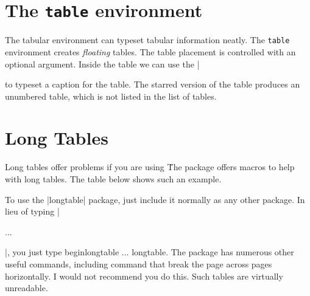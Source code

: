 \clearpage
\begin{multicols}{2}
\section{The \texttt{table} environment}

The tabular environment can typeset tabular information neatly. The \texttt{table} environment creates \textit{floating} tables. The table placement is controlled with an optional argument. Inside the table we can use the |\caption| to typeset a caption for the table. The starred version of the table produces an unumbered table, which is not listed in the list of tables.
\section{Long Tables}

Long tables offer problems if you are using \latex\. The package 
 offers macros to help with long tables. The table below shows such an example.

To use the |longtable| package, just include it normally as any other package. In lieu of typing
|\begin{table} ... \end{table}|, you just type begin{longtable} ... {longtable}. The package has numerous other useful commands, including command that break the page across pages horizontally. I would not recommend you do this. Such tables are virtually unreadable.

\end{multicols}

%


